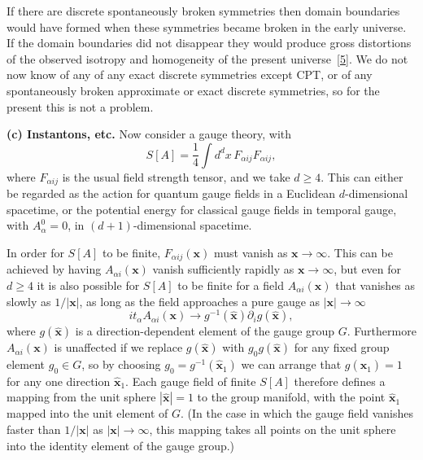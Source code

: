 If there are discrete spontaneously broken symmetries then domain
boundaries would have formed when these symmetries became broken in the
early universe. If the domain boundaries did not disappear they would
produce gross distortions of the observed isotropy and homogeneity of the
present universe~\hyperref[ch23-ref-5]{[5]}. We do not now know of any of
any exact discrete symmetries except CPT, or of any spontaneously broken
approximate or exact discrete symmetries, so for the present this is not a
problem.

\noindent\textbf{(c) Instantons, etc.} Now consider a gauge theory, with
\begin{equation}
 S[A]=\frac{1}{4}\int d^d x\,F_{\alpha ij}F_{\alpha ij},
 \tag{23.1.6}\label{eq:23.1.6}
\end{equation}
where $F_{\alpha ij}$ is the usual field strength tensor, and we take
$d\geq4$. This can either be regarded as the action for quantum gauge
fields in a Euclidean $d$-dimensional spacetime, or the potential energy for
classical gauge fields in temporal gauge, with $A_\alpha^0=0$, in
$(d+1)$-dimensional spacetime.

In order for $S[A]$ to be finite, $F_{\alpha ij}(\mathbf{x})$ must vanish as
$\mathbf{x}\to\infty$. This can be achieved by having
$A_{\alpha i}(\mathbf{x})$ vanish sufficiently rapidly as
$\mathbf{x}\to\infty$, but even for $d\geq4$ it is also possible for $S[A]$
to be finite for a field $A_{\alpha i}(\mathbf{x})$ that vanishes as slowly
as $1/|\mathbf{x}|$, as long as the field approaches a pure gauge as
$|\mathbf{x}|\to\infty$
\begin{equation}
 it_\alpha A_{\alpha i}(\mathbf{x})
 \longrightarrow
 g^{-1}(\hat{\mathbf{x}})\partial_i g(\hat{\mathbf{x}}),
 \tag{23.1.7}\label{eq:23.1.7}
\end{equation}
where $g(\hat{\mathbf{x}})$ is a direction-dependent element of the gauge
group $G$. Furthermore $A_{\alpha i}(\mathbf{x})$ is unaffected if we
replace $g(\hat{\mathbf{x}})$ with $g_0g(\hat{\mathbf{x}})$ for any fixed
group element $g_0\in G$, so by choosing
$g_0=g^{-1}(\hat{\mathbf{x}}_1)$ we can arrange that
$g(\hat{\mathbf{x}}_1)=1$ for any one direction $\hat{\mathbf{x}}_1$. Each
gauge field of finite $S[A]$ therefore defines a mapping from the unit
sphere $|\hat{\mathbf{x}}|=1$ to the group manifold, with the point
$\hat{\mathbf{x}}_1$ mapped into the unit element of $G$. (In the case in
which the gauge field vanishes faster than $1/|\mathbf{x}|$ as
$|\mathbf{x}|\to\infty$, this mapping takes all points on the unit sphere
into the identity element of the gauge group.)

